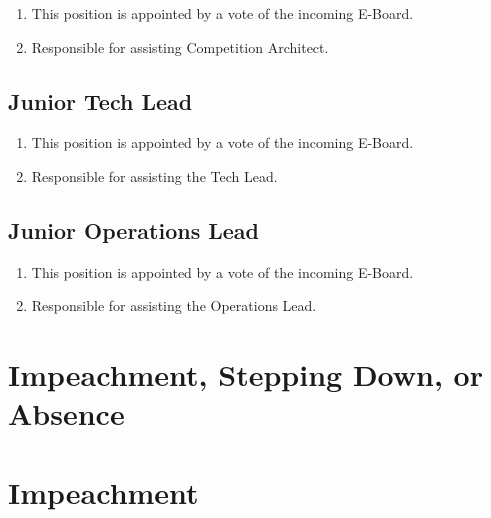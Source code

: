 \documentclass{article}
\begin{document}
\begin{enumerate}
  \item This position is appointed by a vote of the incoming E-Board.
  \item Responsible for assisting Competition Architect.
\end{enumerate}

\subsection{Junior Tech Lead}

\begin{enumerate}
  \item This position is appointed by a vote of the incoming E-Board.
  \item Responsible for assisting the Tech Lead.
\end{enumerate}

\subsection{Junior Operations Lead}

\begin{enumerate}
  \item This position is appointed by a vote of the incoming E-Board.
  \item Responsible for assisting the Operations Lead.
\end{enumerate}


\section{Impeachment, Stepping Down, or Absence}

\section{Impeachment}
\end{document}
